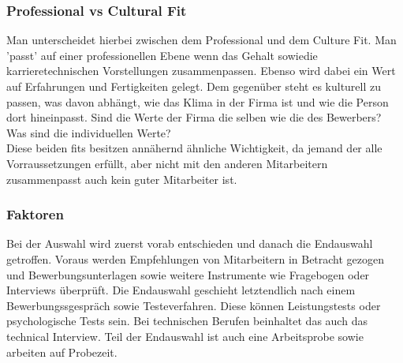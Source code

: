 \documentclass{article}
\begin{document}
	 \subsubsection{Professional vs Cultural Fit}
	 Man unterscheidet hierbei zwischen dem Professional und dem Culture Fit. Man 'passt' auf einer professionellen Ebene wenn das Gehalt sowiedie karrieretechnischen Vorstellungen zusammenpassen. Ebenso wird dabei ein Wert auf Erfahrungen und Fertigkeiten gelegt. Dem gegenüber steht es kulturell zu passen, was davon abhängt, wie das Klima in der Firma ist und wie die Person dort hineinpasst. Sind die Werte der Firma die selben wie die des Bewerbers? Was sind die individuellen Werte? \\
	 Diese beiden fits besitzen annähernd ähnliche Wichtigkeit, da jemand der alle Vorraussetzungen erfüllt, aber nicht mit den anderen Mitarbeitern zusammenpasst auch kein guter Mitarbeiter ist.
	 \subsubsection{Faktoren}
	 Bei der Auswahl wird zuerst vorab entschieden und danach die Endauswahl getroffen. Voraus werden Empfehlungen von Mitarbeitern in Betracht gezogen und Bewerbungsunterlagen sowie weitere Instrumente wie Fragebogen oder Interviews überprüft. Die Endauswahl geschieht letztendlich nach einem Bewerbungssgespräch sowie Testeverfahren. Diese können Leistungstests oder psychologische Tests sein. Bei technischen Berufen beinhaltet das auch das technical Interview. Teil der Endauswahl ist auch eine Arbeitsprobe sowie arbeiten auf Probezeit.
\end{document}
